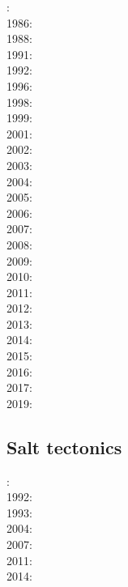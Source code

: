 : \cite{bosw85}\\
1986: \cite{hoen86b}\cite{zupf86}\cite{zupa86}\\
1988: \cite{bums88}\\
1991: \cite{trbr91}\cite{buck91}\\
1992: \cite{zieg92b}\\
1996: \cite{dusa96}\cite{beda96}\\
1998: \cite{rafm98}\\
1999: \cite{brun99}\cite{bulp99}\\
2001: \cite{hupc01}\\
2002: \cite{hube02}\cite{hani02}\cite{dabm02}\\
2003: \cite{hube03}\cite{hani03}\cite{covb03}\\
2004: \cite{hier04}\\
2005: \cite{hubb05}\cite{coub05}\\
2006: \cite{tibs06}\cite{coma06}\\
2007: \cite{huha07}\\
2008: \cite{cort08}\\
2009: \cite{agcz09}\cite{kekj09}\\
2010: \cite{aubh10}\\
2011: \cite{alht11}\\
2012: \cite{alht12}\cite{brps12}\\
2013: \cite{alhf13}\cite{brau13}\cite{chbe13}\cite{knak13}\cite{kern13}\\
2014: \cite{hebr14}\cite{lige14}\cite{brun14}\cite{kobf14}\\
2015: \cite{nabu15}\\
2016: \cite{olbm16}\cite{jekm16}\cite{zwsn16}\\
2017: \cite{lemh17}\\
2019: \cite{lisp19}\cite{zwsb19}

\subsection*{Salt tectonics}

: \cite{tars91}\\
1992: \cite{zaju92}\\
1993: \cite{nabr93}\\
2004: \cite{istt04}\\
2007: \cite{huja07}\\
2011: \cite{brfo11}\\
2014: \cite{bakp14}

